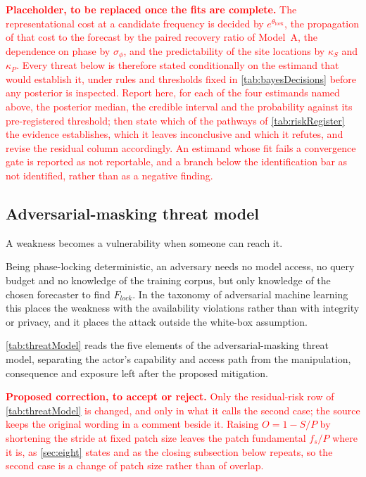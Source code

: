 \textcolor{red}{\textbf{Placeholder, to be replaced once the fits are complete.} The representational cost at a candidate frequency is decided by $e^{\theta_{\mathrm{lock}}}$, the propagation of that cost to the forecast by the paired recovery ratio of Model~A, the dependence on phase by $\sigma_\phi$, and the predictability of the site locations by $\kappa_S$ and $\kappa_P$. Every threat below is therefore stated conditionally on the estimand that would establish it, under rules and thresholds fixed in \autoref{tab:bayesDecisions} before any posterior is inspected. Report here, for each of the four estimands named above, the posterior median, the credible interval and the probability against its pre-registered threshold; then state which of the pathways of \autoref{tab:riskRegister} the evidence establishes, which it leaves inconclusive and which it refutes, and revise the residual column accordingly. An estimand whose fit fails a convergence gate is reported as not reportable, and a branch below the identification bar as not identified, rather than as a negative finding.}



\subsection{Adversarial-masking threat model}
A weakness becomes a vulnerability when someone can reach it.

Being phase-locking deterministic, an adversary needs no model access, no query budget and no knowledge of the training corpus, but only knowledge of the chosen forecaster to find $F_{lock}$. In the taxonomy of adversarial machine learning\autocite{vassilevAdversarialMachineLearning2024} this places the weakness with the availability violations rather than with integrity or privacy, and it places the attack outside the white-box assumption.

\autoref{tab:threatModel} reads the five elements of the adversarial-masking threat model\autocite{vassilevAdversarialMachineLearning2024}, separating the actor's capability and access path from the manipulation, consequence and exposure left after the proposed mitigation.



\textcolor{red}{\textbf{Proposed correction, to accept or reject.} Only the residual-risk row of \autoref{tab:threatModel} is changed, and only in what it calls the second case; the source keeps the original wording in a comment beside it. Raising $O=1-S/P$ by shortening the stride at fixed patch size leaves the patch fundamental $f_s/P$ where it is, as \autoref{sec:eight} states and as the closing subsection below repeats, so the second case is a change of patch size rather than of overlap.}

